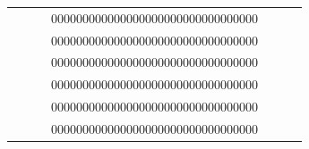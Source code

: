 \documentclass[electronics,article,accept,pdftex,moreauthors]{Definitions/mdpi}
\begin{document}
\begin{enumerate}[label={\arabic*).}]
\begin{table}[H]
{\begin{tabular}{lcccccc}
  &            &                                 &000000000000000000000000000000000&                                 &\\  
  &            &                                 &000000000000000000000000000000000&                                 &\\  
  &            &                                 &000000000000000000000000000000000&                                 &\\  
  &            &                                 &000000000000000000000000000000000&                                 &\\  
  &            &                                 &000000000000000000000000000000000&                                 &\\  
  &            &                                 &000000000000000000000000000000000&                                 &\\  

    \bottomrule
    \end{tabular}%
}

\end{table}
\end{enumerate}
\end{document}
